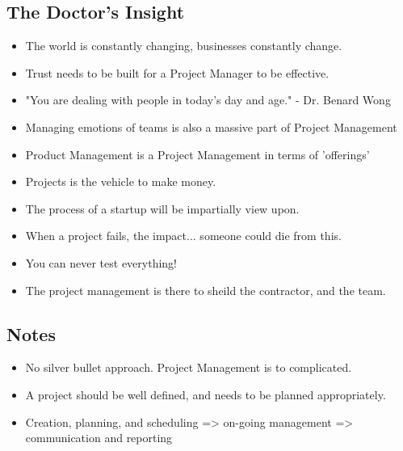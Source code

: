 \documentclass[a4paper,10pt]{article}
\begin{document}
\subsection{The Doctor's Insight}
\begin{itemize}
    \item The world is constantly changing, businesses constantly change.
    \item Trust needs to be built for a Project Manager to be effective.
    \item "You are dealing with people in today's day and age." - Dr. Benard Wong
    \item Managing emotions of teams is also a massive part of Project Management
    \item Product Management is a Project Management in terms of 'offerings'
    \item Projects is the vehicle to make money.
    \item The process of a startup will be impartially view upon.
    \item When a project fails, the impact... someone could die from this.
    \item You can never test everything!
    \item The project management is there to sheild the contractor, and the team.
\end{itemize}

\subsection{Notes}
\begin{itemize}
    \item No silver bullet approach. Project Management is to complicated.
    \item A project should be well defined, and needs to be planned appropriately.
    \item Creation, planning, and scheduling => on-going management => communication and reporting
\end{itemize}
\end{document}
